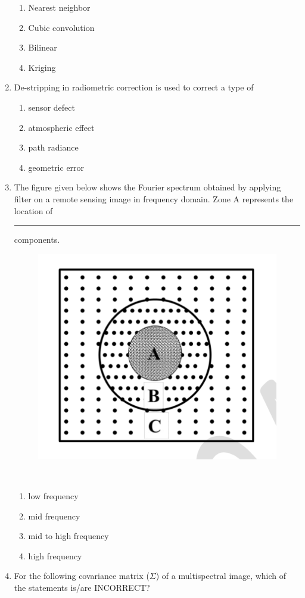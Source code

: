 \documentclass[12pt]{article}
\begin{document}
\begin{enumerate}
\begin{enumerate}
 \item Nearest neighbor 
   \item Cubic convolution 
   \item Bilinear 
   \item Kriging
\end{enumerate}

\item De-stripping in radiometric correction is used to correct a type of 

\begin{enumerate}
    \item sensor defect 
   \item atmospheric effect 
   \item path radiance 
   \item geometric error
\end{enumerate}

\item The figure given below shows the Fourier spectrum obtained by applying filter on
a remote sensing image in frequency domain. Zone A represents the location of
\rule{2cm}{0.15mm} components. \\
\begin{figure}[H]
\centering
\includegraphics[width=0.5\linewidth]{Figs/LatexImage9.png}
\end{figure} \\

 \begin{enumerate}
    \item low frequency 
   \item mid frequency 
   \item mid to high frequency 
   \item high frequency
      \end{enumerate}

\item For the following covariance matrix ($\Sigma$) of a multispectral image, which of the
statements is/are INCORRECT?\\


\end{enumerate}
\end{document}
